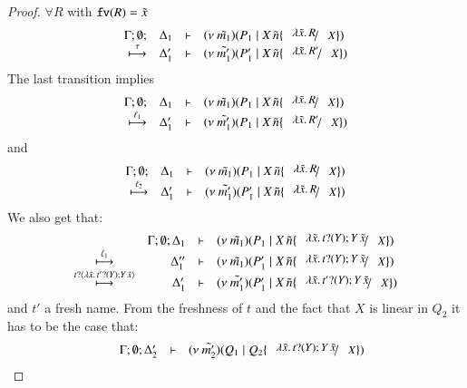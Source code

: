 \begin{proof}
	\noi $\forall R$ with $\mathtt{fv}(R) = \tilde{x}$
%
	\[
		\mhorel{\Gamma}{\Delta_1}{\newsp{\tilde{m_1}}{P_1 \Par \appl{X}{\tilde{n}} \subst{\abs{\tilde{x}}{R}}{X}}}
		{\hby{\tau}}
		{\Delta_1'}{}{\newsp{\tilde{m_1'}}{P_1' \Par \appl{X}{\tilde{n}} \subst{\abs{\tilde{x}}{R'}}{X}}}
	\]
%
	\noi The last transition implies
	\[
		\mhorel{\Gamma}{\Delta_1}{\newsp{\tilde{m_1}}{P_1 \Par \appl{X}{\tilde{n}} \subst{\abs{\tilde{x}}{R}}{X}}}
		{\hby{\ell_1}}
		{\Delta_1'}{}{\newsp{\tilde{m_1'}}{P_1 \Par \appl{X}{\tilde{n}} \subst{\abs{\tilde{x}}{R'}}{X}}}
	\]
%
	\noi and
%
	\[
		\mhorel{\Gamma}{\Delta_1}{\newsp{\tilde{m_1}}{P_1 \Par \appl{X}{\tilde{n}} \subst{\abs{\tilde{x}}{R}}{X}}}
		{\hby{\ell_2}}
		{\Delta_1'}{}{\newsp{\tilde{m_1'}}{P_1' \Par \appl{X}{\tilde{n}} \subst{\abs{\tilde{x}}{R}}{X}}}
	\]
%
	\noi We also get that:
%
	\[
		\begin{array}{crll}
			&\Gamma; \es; \Delta_1 & \proves &
			\newsp{\tilde{m_1}}{P_1 \Par \appl{X}{\tilde{n}} \subst{\abs{\tilde{x}}{\binp{t}{Y} \appl{Y}{\tilde{x}}}}{X}} \\
			\hby{\ell_1} & \Delta_1'' & \proves & \newsp{\tilde{m_1}}{P_1' \Par \appl{X}{\tilde{n}} \subst{\abs{\tilde{x}}{\binp{t}{Y} \appl{Y}{\tilde{x}}}}{X}} \\
			\hby{\bactinp{t}{\abs{\tilde{x}}{\binp{t'}{Y} \appl{Y}{\tilde{x}}}}} 
			&\Delta_1'& \proves & \newsp{\tilde{m_1'}}{P_1' \Par \appl{X}{\tilde{n}} \subst{\abs{\tilde{x}}{\binp{t'}{Y} \appl{Y}{\tilde{x}}}}{X}}
		\end{array}
	\]
%
%
	\noi and $t'$ a fresh name. From the freshness of $t$ and the fact that $X$ is linear in $Q_2$
	it has to be the case that:
%
	\[
		\begin{array}{crll}
			& \Gamma; \es; \Delta_2'&  \proves &
			\newsp{\tilde{m_2'}}{Q_1 \Par Q_2 \subst{\abs{\tilde{x}}{\binp{t}{Y} \appl{Y}{\tilde{x}}}}{X}}\\

\end{array}\]
\end{proof}
